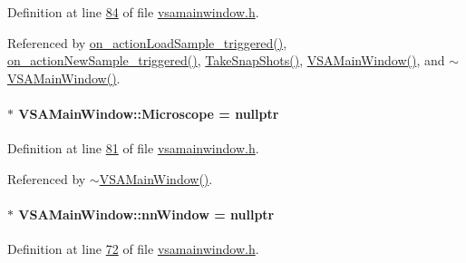 Definition at line \hyperlink{vsamainwindow_8h_source_l00084}{84} of file \hyperlink{vsamainwindow_8h_source}{vsamainwindow.\+h}.



Referenced by \hyperlink{vsamainwindow_8cpp_source_l00475}{on\+\_\+action\+Load\+Sample\+\_\+triggered()}, \hyperlink{vsamainwindow_8cpp_source_l00361}{on\+\_\+action\+New\+Sample\+\_\+triggered()}, \hyperlink{vsamainwindow_8cpp_source_l00391}{Take\+Snap\+Shots()}, \hyperlink{vsamainwindow_8cpp_source_l00004}{V\+S\+A\+Main\+Window()}, and \hyperlink{vsamainwindow_8cpp_source_l00254}{$\sim$\+V\+S\+A\+Main\+Window()}.

\hypertarget{class_v_s_a_main_window_a63378add125c78c9a83a3babe03318d7}{}
\paragraph[{Microscope}]{$\ast$ V\+S\+A\+Main\+Window\+::\+Microscope = nullptr\hspace{0.3cm}{\ttfamily [private]}}\label{class_v_s_a_main_window_a63378add125c78c9a83a3babe03318d7}


Definition at line \hyperlink{vsamainwindow_8h_source_l00081}{81} of file \hyperlink{vsamainwindow_8h_source}{vsamainwindow.\+h}.



Referenced by \hyperlink{vsamainwindow_8cpp_source_l00254}{$\sim$\+V\+S\+A\+Main\+Window()}.

\hypertarget{class_v_s_a_main_window_a48dca9faab39674c88d8eb862995f11e}{}
\paragraph[{nn\+Window}]{$\ast$ V\+S\+A\+Main\+Window\+::nn\+Window = nullptr\hspace{0.3cm}{\ttfamily [private]}}\label{class_v_s_a_main_window_a48dca9faab39674c88d8eb862995f11e}


Definition at line \hyperlink{vsamainwindow_8h_source_l00072}{72} of file \hyperlink{vsamainwindow_8h_source}{vsamainwindow.\+h}.



